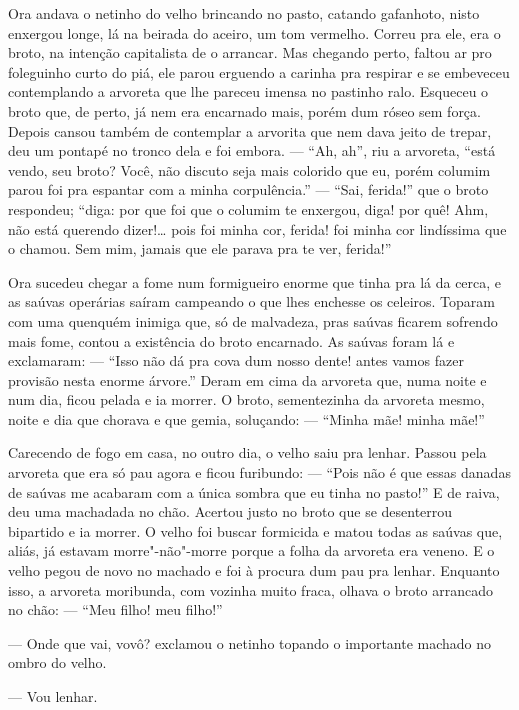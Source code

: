 Ora andava o netinho do velho brincando no pasto, catando gafanhoto,
nisto enxergou longe, lá na beirada do aceiro, um tom vermelho. Correu
pra ele, era o broto, na intenção capitalista de o arrancar. Mas
chegando perto, faltou ar pro foleguinho curto do piá, ele parou
erguendo a carinha pra respirar e se embeveceu contemplando a arvoreta
que lhe pareceu imensa no pastinho ralo. Esqueceu o broto que, de perto,
já nem era encarnado mais, porém dum róseo sem força. Depois cansou
também de contemplar a arvorita que nem dava jeito de trepar, deu um
pontapé no tronco dela e foi embora. --- ``Ah, ah'', riu a arvoreta, ``está
vendo, seu broto? Você, não discuto seja mais colorido que eu, porém
columim parou foi pra espantar com a minha corpulência.'' --- ``Sai,
ferida!'' que o broto respondeu; ``diga: por que foi que o columim te
enxergou, diga! por quê! Ahm, não está querendo dizer!\ldots{} pois foi minha
cor, ferida! foi minha cor lindíssima que o chamou. Sem mim, jamais que
ele parava pra te ver, ferida!''

Ora sucedeu chegar a fome num formigueiro enorme que tinha pra lá da
cerca, e as saúvas operárias saíram campeando o que lhes enchesse os
celeiros. Toparam com uma quenquém inimiga que, só de malvadeza, pras
saúvas ficarem sofrendo mais fome, contou a existência do broto
encarnado. As saúvas foram lá e exclamaram: --- ``Isso não dá pra cova dum
nosso dente! antes vamos fazer provisão nesta enorme árvore.'' Deram em
cima da arvoreta que, numa noite e num dia, ficou pelada e ia morrer. O
broto, sementezinha da arvoreta mesmo, noite e dia que chorava e que
gemia, soluçando: --- ``Minha mãe! minha mãe!''

Carecendo de fogo em casa, no outro dia, o velho saiu pra lenhar. Passou
pela arvoreta que era só pau agora e ficou furibundo: --- ``Pois não é que
essas danadas de saúvas me acabaram com a única sombra que eu tinha no
pasto!'' E de raiva, deu uma machadada no chão. Acertou justo no broto
que se desenterrou bipartido e ia morrer. O velho foi buscar formicida e
matou todas as saúvas que, aliás, já estavam morre"-não"-morre porque a
folha da arvoreta era veneno. E o velho pegou de novo no machado e foi à
procura dum pau pra lenhar. Enquanto isso, a arvoreta moribunda, com
vozinha muito fraca, olhava o broto arrancado no chão: --- ``Meu filho!
meu filho!''

--- Onde que vai, vovô? exclamou o netinho topando o importante machado
no ombro do velho.

--- Vou lenhar.

